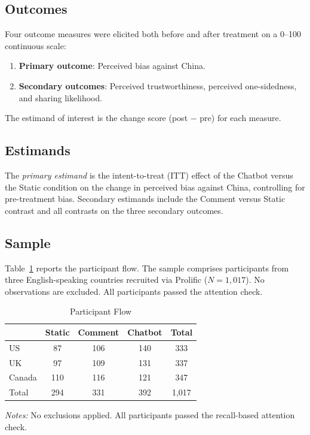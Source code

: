 \documentclass[12pt]{article}
\begin{document}
\subsection{Outcomes}

Four outcome measures were elicited both before and after treatment on a 0--100 continuous scale:
\begin{enumerate}
    \item \textbf{Primary outcome}: Perceived bias against China.
    \item \textbf{Secondary outcomes}: Perceived trustworthiness, perceived one-sidedness, and sharing likelihood.
\end{enumerate}
The estimand of interest is the change score (post $-$ pre) for each measure.

\subsection{Estimands}

The \textit{primary estimand} is the intent-to-treat (ITT) effect of the Chatbot versus the Static condition on the change in perceived bias against China, controlling for pre-treatment bias. Secondary estimands include the Comment versus Static contrast and all contrasts on the three secondary outcomes.

\subsection{Sample}

Table~\ref{tab:flow} reports the participant flow. The sample comprises participants from three English-speaking countries recruited via Prolific ($N=1{,}017$). No observations are excluded. All participants passed the attention check.

\begin{table}[H]
\centering
\caption{Participant Flow}
\label{tab:flow}
\begin{tabular}{lcccc}
\toprule
 & Static & Comment & Chatbot & Total \\
\midrule
US     & 87  & 106 & 140 & 333 \\
UK     & 97  & 109 & 131 & 337 \\
Canada & 110 & 116 & 121 & 347 \\
\midrule
Total  & 294 & 331 & 392 & 1,017 \\
\bottomrule
\end{tabular}
\par\vspace{4pt}
\begin{minipage}{\textwidth}
\footnotesize \textit{Notes:} No exclusions applied. All participants passed the recall-based attention check.
\end{minipage}
\end{table}
\end{document}
